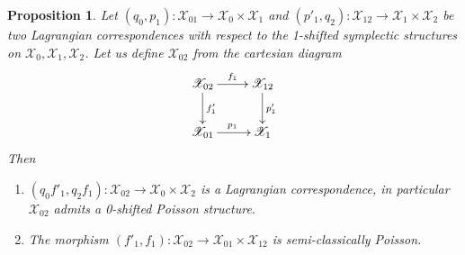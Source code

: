 \documentclass[reqno]{amsart}
\newtheorem{prop}[theorem]{Proposition}
\theoremstyle{definition}
\theoremstyle{remark}
\newcommand{\sX}{\mathscr{X}}
\numberwithin{equation}{section}
\begin{document}
\begin{prop}\label{prop:composition of Lag}
Let $(q_0,p_1): \sX_{01}\to \sX_{0}\times \sX_{1}$ and $(p'_1,q_2): \sX_{12}\to \sX_{1}\times \sX_{2}$ be two Lagrangian correspondences with respect to the 1-shifted symplectic structures on $\sX_{0},\sX_{1},\sX_{2}$. Let us define $\sX_{02}$ from the cartesian diagram
\[\xymatrix{ \sX_{02}\ar[r]^{f_1}\ar[d]^{f'_1} & \sX_{12}\ar[d]^{p'_1}\\
\sX_{01}\ar[r]^{p_1} & \sX_{1}
}\] 
Then
\begin{enumerate}
\item[(1)] $(q_0f'_1, q_2f_1):\sX_{02}\to \sX_{0}\times \sX_{2}$ is a Lagrangian correspondence, in particular $\sX_{02}$ admits a 0-shifted Poisson structure.
\item[(2)] The morphism $(f'_1,f_1):\sX_{02}\to \sX_{01}\times \sX_{12}$ is semi-classically Poisson.
\end{enumerate}
\end{prop}
\end{document}
